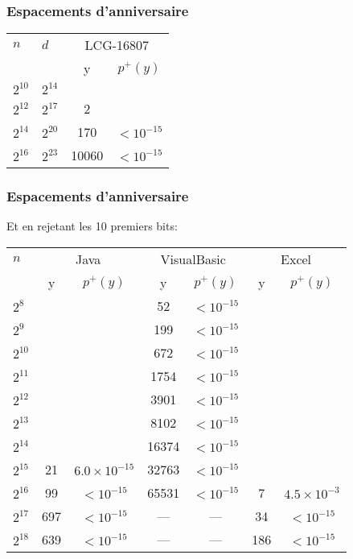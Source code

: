 \documentclass[t,usepdftitle=false]{beamer}
\def\eps {$< 10^{-15}$}
\begin{document}
\begin{frame}
\frametitle{Espacements d'anniversaire}

\begin {center}
\begin {tabular}{|ll|cc|}
\hline
 \rule{0pt}{11pt} $n$  &  $d$ &
\multicolumn{2}{c|}{LCG-16807} \\
\rule{0pt}{11pt} && y & $p^+(y)$ \\
\hline
 $2^{10}$ & $2^{14}$  &  & \rule{0pt}{13pt} \\
 $2^{12}$ & $2^{17}$  &    2 & \\
 $2^{14}$ & $2^{20}$  &  170 & \eps \\
 $2^{16}$ & $2^{23}$  & 10060 & \eps \\
\hline
\end {tabular}
\end{center}

\end{frame}

\begin{frame}
\frametitle{Espacements d'anniversaire}

Et en rejetant les 10 premiers bits:
\begin {center}
\begin {tabular}{|l|cc|cc|cc|}
\hline
 \rule{0pt}{11pt} $n$  & 
\multicolumn{2}{c|}{Java} & 
\multicolumn{2}{c|}{VisualBasic} & 
\multicolumn{2}{c|}{Excel} \\
 \rule{0pt}{11pt} & y & $p^+(y)$ & y & $p^+(y)$ & y & $p^+(y)$ \\
\hline
  $2^{8}$    &   & &  52  &\eps   &  &  \rule{0pt}{13pt} \\
  $2^{9}$    &   & &  199  &\eps  &  &  \\
  $2^{10}$   &   & &  672   &\eps  &  & \\
  $2^{11}$   &   & &   1754  &  \eps & &  \\
  $2^{12}$   &   & &  3901  & \eps &  &  \\
  $2^{13}$   &   & &  8102  & \eps &  &  \\
  $2^{14}$   &   & &  16374  &\eps  &  &  \\
  $2^{15}$   & 21  &$6.0\times 10^{-15}$ & 32763   &\eps  &  &  \\
  $2^{16}$   & 99  &\eps & 65531   & \eps & 7 & $4.5\times 10^{-3}$  \\
  $2^{17}$   & 697  &\eps &  ---  &---  & 34 &   \eps \\
  $2^{18}$   & 639  & \eps  &---  &---  & 186 &   \eps  \\
\hline
\end {tabular}
\end {center}

\end{frame}
\end{document}
